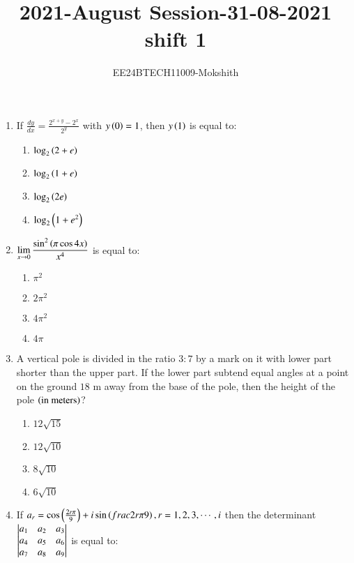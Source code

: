 \documentclass[journal]{IEEEtran}
\begin{document}

\title{2021-August Session-31-08-2021 shift 1}
\author{EE24BTECH11009-Mokshith}
{\let\newpage\relax\maketitle}
\renewcommand{\thefigure}{\theenumi}
\renewcommand{\thetable}{\theenumi}
\setlength{\intextsep}{10pt} %
\renewcommand{\thetable}{\theenumi}

\begin{enumerate}[start=16]
\item If $\frac{dy}{dx} = \frac{2^{x+y}-2^x}{2^y}$ with $y\left(0\right)=1$, then $y\left(1\right)$ is equal to:
\begin{enumerate}
\item $\log_2\left(2 + e\right)$
\item $\log_2\left(1 + e\right)$
\item $\log_2\left(2e\right)$
\item $\log_2\left(1 + e^2\right)$
\end{enumerate}
\item $\displaystyle \lim_{x \to 0} \frac{\sin^2\left(\pi\cos 4x\right)}{x^4}$
is equal to:
\begin{enumerate}
\item $\pi^2$  
\item $2\pi^2$
\item $4\pi^2$
\item $4\pi$
\end{enumerate}
\item A vertical pole is divided in the ratio $3:7$ by a mark on it with lower part shorter than the upper part. If the lower part subtend equal angles at a point on the ground $18$ m away from the base of the pole, then the height of the pole $\left(\text{in meters}\right)$?
\begin{enumerate}
\item $12\sqrt{15}$
\item$12\sqrt{10}$
\item $8\sqrt{10}$
\item $6\sqrt{10}$
\end{enumerate}
\item If $a_r = \cos\left(\frac{2r\pi}{9}\right) + i\sin\left(frac{2r\pi}{9}\right), r= 1,2,3,\cdots,i$ then the determinant 
$\begin{vmatrix}
a_1 & a_2 & a_3 \\
a_4 & a_5 & a_6 \\
a_7 & a_8 & a_9\end{vmatrix}
$
 is equal to:
\begin{enumerate}

\end{enumerate}
\end{enumerate}
\end{document}
